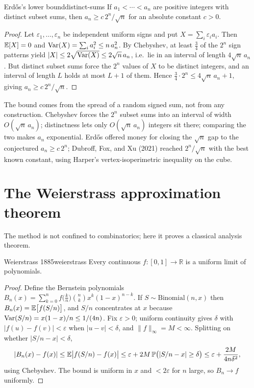 \begin{theorem}{Erd\H{o}s's lower bound}{distinct-sums}
If $a_1<\cdots<a_n$ are positive integers with distinct subset sums, then
$a_n\ge c\,2^n/\sqrt n$ for an absolute constant $c>0$.
\end{theorem}

\begin{proof}
Let $\varepsilon_1,\dots,\varepsilon_n$ be independent uniform signs and put
$X=\sum_i\varepsilon_i a_i$. Then $\mathbb{E}[X]=0$ and
$\operatorname{Var}(X)=\sum_i a_i^2\le n\,a_n^2$. By Chebyshev, at least $\tfrac34$ of the
$2^n$ sign patterns yield $|X|\le 2\sqrt{\operatorname{Var}(X)}\le 2\sqrt n\,a_n$, i.e.\ lie
in an interval of length $4\sqrt n\,a_n$. But distinct subset sums force the
$2^n$ values of $X$ to be distinct integers, and an interval of length $L$
holds at most $L+1$ of them. Hence $\tfrac34\cdot2^n\le 4\sqrt n\,a_n+1$, giving
$a_n\ge c\,2^n/\sqrt n$.
\end{proof}

\begin{insight}
The bound comes from the spread of a random signed sum, not from any
construction. Chebyshev forces the $2^n$ subset sums into an interval of width
$O(\sqrt n\,a_n)$; distinctness lets only $O(\sqrt n\,a_n)$ integers sit there;
comparing the two makes $a_n$ exponential. Erd\H{o}s offered money for closing
the $\sqrt n$ gap to the conjectured $a_n\ge c\,2^n$; Dubroff, Fox, and Xu
(2021) reached $2^n/\sqrt n$ with the best known constant, using Harper's
vertex-isoperimetric inequality on the cube.
\end{insight}

\section{The Weierstrass approximation theorem}

The method is not confined to combinatorics; here it proves a classical
analysis theorem.

\begin{theorem}{Weierstrass 1885}{weierstrass}
Every continuous $f\colon[0,1]\to\mathbb R$ is a uniform limit of polynomials.
\end{theorem}

\begin{proof}
Define the Bernstein polynomials
$B_n(x)=\sum_{k=0}^n f\!\bigl(\tfrac kn\bigr)\binom nk x^k(1-x)^{n-k}$. If
$S\sim\mathrm{Binomial}(n,x)$ then $B_n(x)=\mathbb{E}\bigl[f(S/n)\bigr]$, and
$S/n$ concentrates at $x$ because $\operatorname{Var}(S/n)=x(1-x)/n\le 1/(4n)$. Fix
$\varepsilon>0$; uniform continuity gives $\delta$ with
$|f(u)-f(v)|<\varepsilon$ when $|u-v|<\delta$, and $\|f\|_\infty=M<\infty$.
Splitting on whether $|S/n-x|<\delta$,
\[
  |B_n(x)-f(x)|\le\mathbb{E}\bigl|f(S/n)-f(x)\bigr|
  \le\varepsilon+2M\,\mathbb{P}\bigl(|S/n-x|\ge\delta\bigr)
  \le\varepsilon+\frac{2M}{4n\delta^2},
\]
using Chebyshev. The bound is uniform in $x$ and $<2\varepsilon$ for $n$ large,
so $B_n\to f$ uniformly.
\end{proof}

